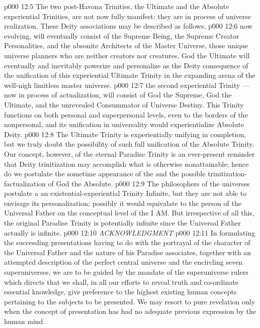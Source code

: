 \vs p000 12:5 \pc The two post\hyp{}Havona Trinities, the Ultimate and the Absolute experiential Trinities, are not now fully manifest; they are in process of universe realization. These Deity associations may be described as follows:
\vs p000 12:6 \bibnobreakspace {} now evolving, will eventually consist of the Supreme Being, the Supreme Creator Personalities, and the absonite Architects of the Master Universe, those unique universe planners who are neither creators nor creatures. God the Ultimate will eventually and inevitably powerize and personalize as the Deity consequence of the unification of this experiential Ultimate Trinity in the expanding arena of the well\hyp{}nigh limitless master universe.
\vs p000 12:7 \bibnobreakspace {} the second experiential Trinity --- now in process of actualization, will consist of God the Supreme, God the Ultimate, and the unrevealed Consummator of Universe Destiny. This Trinity functions on both personal and superpersonal levels, even to the borders of the nonpersonal, and its unification in universality would experientialize Absolute Deity.
\vs p000 12:8 \pc The Ultimate Trinity is experientially unifying in completion, but we truly doubt the possibility of such full unification of the Absolute Trinity. Our concept, however, of the eternal Paradise Trinity is an ever\hyp{}present reminder that Deity trinitization may accomplish what is otherwise nonattainable; hence do we postulate the sometime appearance of the  and the possible trinitization\hyp{}factualization of God the Absolute.
\vs p000 12:9 \pc The philosophers of the universes postulate a  an existential\hyp{}experiential Trinity Infinite, but they are not able to envisage its personalization; possibly it would equivalate to the person of the Universal Father on the conceptual level of the I AM. But irrespective of all this, the original Paradise Trinity is potentially infinite since the Universal Father actually is infinite.
\vspace*{0.5\baselineskip}
\vs p000 12:10 {\hspace*{0.24\columnwidth}\itshape ACKNOWLEDGMENT}
\vs p000 12:11 In formulating the succeeding presentations having to do with the portrayal of the character of the Universal Father and the nature of his Paradise associates, together with an attempted description of the perfect central universe and the encircling seven superuniverses, we are to be guided by the mandate of the superuniverse rulers which directs that we shall, in all our efforts to reveal truth and co\hyp{}ordinate essential knowledge, give preference to the highest existing human concepts pertaining to the subjects to be presented. We may resort to pure revelation only when the concept of presentation has had no adequate previous expression by the human mind.
